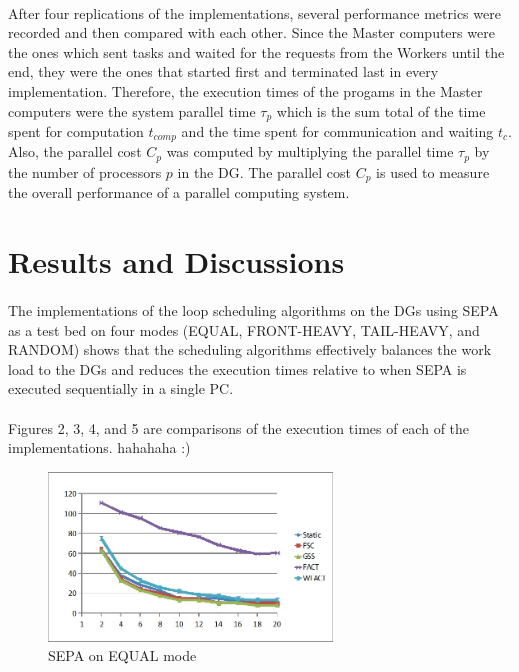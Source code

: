 \documentclass[10pt, twocolumn, letterpaper]{article}
\begin{document}
\paragraph{}
After four replications of the implementations, several performance metrics were recorded and then compared with each other. Since the Master computers were the ones which sent tasks and waited for the requests from the Workers until the end, they were the ones that started first and terminated last in every implementation. Therefore, the execution times of the progams in the Master computers were the system parallel time $\tau_p$ which is the sum total of the time spent for computation $t_{comp}$ and the time spent for communication and waiting $t_c$. Also, the parallel cost $C_p$ was computed by multiplying the parallel time $\tau_p$ by the number of processors $p$ in the DG\cite{pabico}. The parallel cost $C_p$ is used to measure the overall performance of a parallel computing system.

\section{Results and Discussions}

\paragraph{}
The implementations of the loop scheduling algorithms on the DGs using SEPA as a test bed on four modes (\textsf{EQUAL}, \textsf{FRONT-HEAVY}, \textsf{TAIL-HEAVY}, and \textsf{RANDOM}) shows that the scheduling algorithms effectively balances the work load to the DGs and reduces the execution times relative to when SEPA is executed sequentially in a single PC.

\paragraph{}
Figures 2, 3, 4, and 5 are comparisons of the execution times of each of the implementations. hahahaha :)

\begin{figure}[h]
\begin{center}  
  \includegraphics[height=45mm]{graphs/equal.jpg}
  \caption{SEPA on \textsf{EQUAL} mode}
\end{center}
\end{figure}
\end{document}
